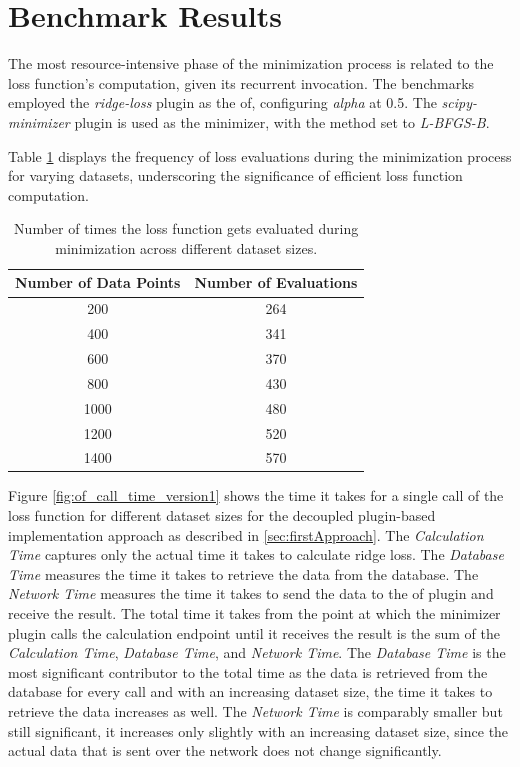\documentclass[
  a4paper,  %
  twoside,  %
  bibliography=totoc,
  headsepline,
  cleardoublepage=empty,
  parskip=half,
  draft=false
]{scrbook}
\begin{document}
\section{Benchmark Results}
\label{subsec:benchmarkingResults}

The most resource-intensive phase of the minimization process is related to the loss function's computation, given its recurrent invocation.
The benchmarks employed the \emph{ridge-loss} plugin as the \gls{of}, configuring \emph{alpha} at 0.5.
The \emph{scipy-minimizer} plugin is used as the minimizer, with the method set to \emph{L-BFGS-B}.

Table \ref{table:of_calls} displays the frequency of loss evaluations during the minimization process for varying datasets, underscoring the significance of efficient loss function computation.

\begin{table}[h!]
  \centering
  \begin{tabular}{cc}
  \toprule
  \textbf{Number of Data Points} & \textbf{Number of Evaluations} \\
  \midrule
  200 & 264 \\
  400 & 341 \\
  600 & 370 \\
  800 & 430 \\
  1000 & 480 \\
  1200 & 520 \\
  1400 & 570 \\
  \bottomrule
  \end{tabular}
  \caption{Number of times the loss function gets evaluated during minimization across different dataset sizes.}
  \label{table:of_calls}
\end{table}

Figure \ref{fig:of_call_time_version1} shows the time it takes for a single call of the loss function for different dataset sizes for the decoupled plugin-based implementation approach as described in \ref{sec:firstApproach}.
The \emph{Calculation Time} captures only the actual time it takes to calculate ridge loss.
The \emph{Database Time} measures the time it takes to retrieve the data from the database.
The \emph{Network Time} measures the time it takes to send the data to the \gls{of} plugin and receive the result.
The total time it takes from the point at which the minimizer plugin calls the calculation endpoint until it receives the result is the sum of the \emph{Calculation Time}, \emph{Database Time}, and \emph{Network Time}.
The \emph{Database Time} is the most significant contributor to the total time as the data is retrieved from the database for every call and with an increasing dataset size, the time it takes to retrieve the data increases as well.
The \emph{Network Time} is comparably smaller but still significant, it increases only slightly with an increasing dataset size, since the actual data that is sent over the network does not change significantly.
\end{document}
